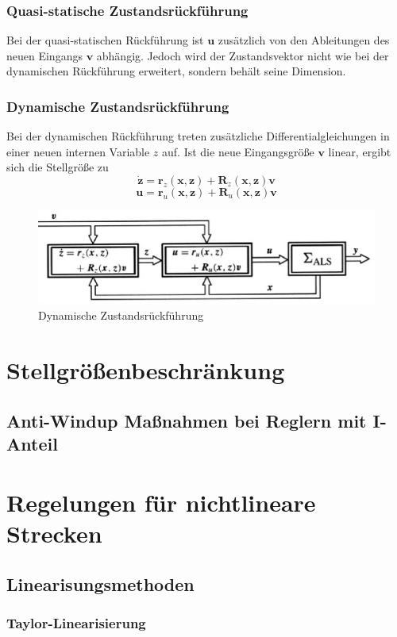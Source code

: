 		\subsubsection{Quasi-statische Zustandsrückführung}
			Bei der quasi-statischen Rückführung ist $ \bm{u} $ zusätzlich von den Ableitungen des neuen Eingangs $ \bm{v} $ abhängig. Jedoch wird der Zustandsvektor nicht wie bei der dynamischen Rückführung erweitert, sondern behält seine Dimension.
		\subsubsection{Dynamische Zustandsrückführung}
			Bei der dynamischen Rückführung treten zusätzliche Differentialgleichungen in einer neuen internen Variable $ z $ auf. Ist die neue Eingangsgröße $ \bm{v} $ linear, ergibt sich die Stellgröße zu
			\[\bm{\dot{z}}=\bm{r}_{z}(\bm{x,z})+\bm{R}_{z}(\bm{x,z})\bm{v}\]
			\[\bm{u} = \bm{r}_{u}(\bm{x,z})+\bm{R}_{u}(\bm{x,z})\bm{v}\]
			\begin{figure}[h]
				\centering
				\includegraphics[width=0.7\linewidth]{./pics/re/dyn}
				\caption{Dynamische Zustandsrückführung}
			\end{figure}


\section{Stellgrößenbeschränkung}
	\subsection{Anti-Windup Maßnahmen bei Reglern mit I-Anteil}
		
\section{Regelungen für nichtlineare Strecken}
	\subsection{Linearisungsmethoden}
		\subsubsection{Taylor-Linearisierung}
